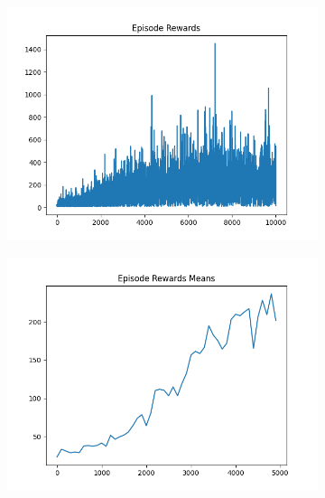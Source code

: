\begin{figure}[H]
    \centering
    \begin{subfigure}{.47\linewidth}
        \centering
        \includegraphics[width=\textwidth]{pole/2024-06-14_17-21-25_dqn_cartpole_episode_rewards.png}
    \end{subfigure}
    \begin{subfigure}{.47\linewidth}
        \centering
        \includegraphics[width=\textwidth]{pole/2024-06-13_21-08-24_dqn_cartpole_episode_rewards_means.png}
    \end{subfigure}
    \begin{subfigure}{.47\linewidth}
        \centering

\end{subfigure}
\end{figure}
